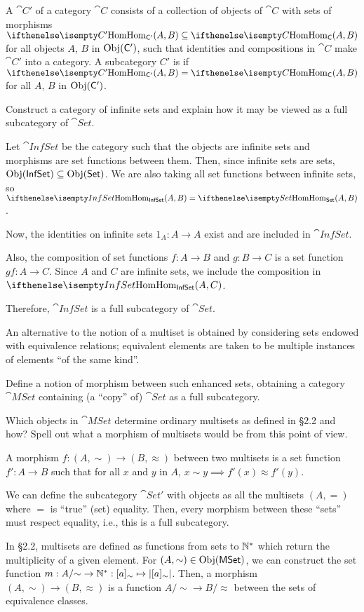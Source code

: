 \documentclass[notes,tikz]{agony}
\begin{document}
\begin{xca}
  A  $\cat C'$ of a category $\cat C$ consists of
  a collection of objects of $\cat C$ with sets of morphisms $\Hom[C'](A,B) \subseteq \Hom[C](A,B)$
  for all objects $A$, $B$ in $\operatorname{Obj}(\mathsf{C}')$,
  such that identities and compositions in $\cat C$ make $\cat C'$ into a category.
  A subcategory $C'$ is  if $\Hom[C'](A,B) = \Hom[C](A,B)$
  for all $A$, $B$ in $\operatorname{Obj}(\mathsf{C}')$.

  Construct a category of infinite sets
  and explain how it may be viewed as a full subcategory of $\cat{Set}$.
\end{xca}
\begin{sol}
  Let $\cat{InfSet}$ be the category such that
  the objects are infinite sets and morphisms are set functions between them.
  Then, since infinite sets are sets, $\operatorname{Obj}(\mathsf{InfSet}) \subseteq \operatorname{Obj}(\mathsf{Set})$.
  We are also taking all set functions between infinite sets,
  so $\Hom[InfSet](A,B) = \Hom[Set](A,B)$.

  Now, the identities on infinite sets $1_A : A \to A$
  exist and are included in $\cat{InfSet}$.

  Also, the composition of set functions $f : A \to B$ and $g : B \to C$
  is a set function $gf : A \to C$.
  Since $A$ and $C$ are infinite sets, we include the composition in $\Hom[InfSet](A,C)$.

  Therefore, $\cat{InfSet}$ is a full subcategory of $\cat{Set}$.
\end{sol}

\begin{xca}\label{msets}
  An alternative to the notion of a multiset is obtained by considering sets
  endowed with equivalence relations;
  equivalent elements are taken to be multiple instances of elements ``of the same kind''.

  Define a notion of morphism between such enhanced sets,
  obtaining a category $\cat{MSet}$ containing (a ``copy'' of) $\cat{Set}$ as a full subcategory.

  Which objects in $\cat{MSet}$ determine ordinary multisets as defined in \S2.2 and how?
  Spell out what a morphism of multisets would be from this point of view.
\end{xca}
\begin{sol}
  A morphism $f : (A,\sim) \to (B,\approx)$ between two multisets
  is a set function $f' : A \to B$ such that
  for all $x$ and $y$ in $A$, $x \sim y \implies f'(x) \approx f'(y)$.

  We can define the subcategory $\cat{Set'}$ with objects
  as all the multisets $(A,=)$ where $=$ is ``true'' (set) equality.
  Then, every morphism between these ``sets'' must respect equality, i.e.,
  this is a full subcategory.

  In \S2.2, multisets are defined as functions from sets to $\mathbb{N}^*$
  which return the multiplicity of a given element.
  For $(A,\sim) \in \operatorname{Obj}(\mathsf{MSet})$, we can construct the set function
  $m : A/{\sim} \to \mathbb{N}^* : [a]_\sim \mapsto \abs{[a]_\sim}$.
  Then, a morphism $(A,\sim) \to (B,\approx)$ is a function $A/{\sim} \to B/{\approx}$
  between the sets of equivalence classes.
\end{sol}
\end{document}
